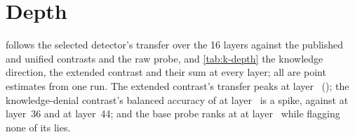 \begin{table}[h]
\centering
\scriptsize
\caption{Every detector on every dataset at layers 20, 40 and 44.}
\label{tab:pertest}
\resizebox{\linewidth}{!}{}
\end{table}

\begin{table}[h]
\centering
\footnotesize
\caption{The sycophancy and unified contrasts.}
\label{tab:syc}
\resizebox{\linewidth}{!}{}
\end{table}

\begin{table}[h]
\centering
\footnotesize
\caption{Token reads of the extended contrast at layer 40.}
\label{tab:reads}
\resizebox{\linewidth}{!}{}
\end{table}

\begin{table}[h]
\centering
\footnotesize
\caption{The extended contrast read on the response against the Follow-Up turn's ``No''.}
\label{tab:followup}
\resizebox{\linewidth}{!}{}
\end{table}

\begin{table}[h]
\centering
\footnotesize
\caption{Probes in the top three persona components.}
\label{tab:kthree}
\resizebox{\linewidth}{!}{}
\end{table}

\FloatBarrier
\section{Depth}
\label{app:depth}

 follows the selected detector's transfer over the 16 layers against the
published and unified contrasts and the raw probe, and \cref{tab:k-depth} the knowledge direction, the
extended contrast and their sum at every layer; all are point estimates from one run. The extended
contrast's transfer peaks at layer~ (); the
knowledge-denial contrast's \hpkr{} balanced accuracy of  at
layer~ is a spike, against  at layer~36
and  at layer~44; and the base probe ranks \hpkr{} at
 at layer~ while flagging none of its
lies.

